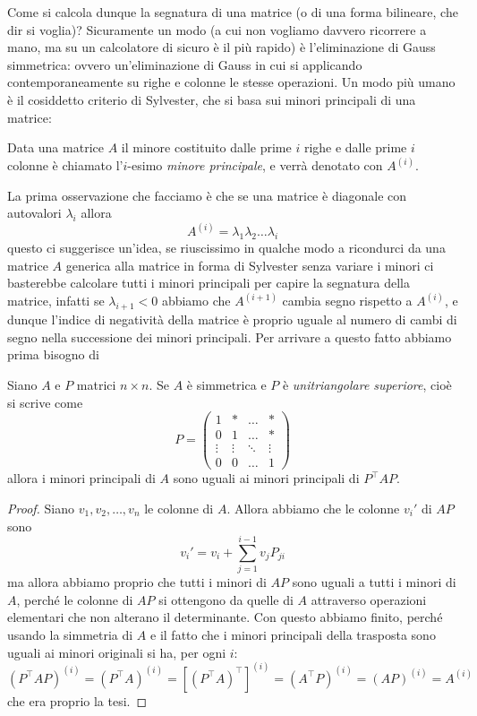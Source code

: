 \documentclass[11pt]{scrartcl}
\begin{document}
	Come si calcola dunque la segnatura di una matrice (o di una forma bilineare, che dir si voglia)? Sicuramente un modo (a cui non vogliamo davvero ricorrere a mano, ma su un calcolatore di sicuro è il più rapido) è l'eliminazione di Gauss simmetrica: ovvero un'eliminazione di Gauss in cui si applicando contemporaneamente su righe e colonne le stesse operazioni. Un modo più umano è il cosiddetto criterio di Sylvester, che si basa sui minori principali di una matrice:
	\begin{definition}
		Data una matrice $A$ il minore costituito dalle prime $i$ righe e dalle prime $i$ colonne è chiamato l'$i$-esimo \textit{minore principale}, e verrà denotato con $A^{(i)}$.
	\end{definition}
	La prima osservazione che facciamo è che se una matrice è diagonale con autovalori $\lambda_i$ allora
	$$A^{(i)}=\lambda_1\lambda_2\dots\lambda_i$$
	questo ci suggerisce un'idea, se riuscissimo in qualche modo a ricondurci da una matrice $A$ generica alla matrice in forma di Sylvester senza variare i minori ci basterebbe calcolare tutti i minori principali per capire la segnatura della matrice, infatti se $\lambda_{i+1}<0$ abbiamo che $A^{(i+1)}$ cambia segno rispetto a $A^{(i)}$, e dunque l'indice di negatività della matrice è proprio uguale al numero di cambi di segno nella successione dei minori principali. Per arrivare a questo fatto abbiamo prima bisogno di
	\begin{lemma}
		Siano $A$ e $P$ matrici $n\times n$. Se $A$ è simmetrica e $P$ è \textit{unitriangolare superiore}, cioè si scrive come
		$$P=
		\begin{pmatrix}
			1 & * & \dots & * \\
			0 & 1 & \dots & * \\
			\vdots & \vdots & \ddots & \vdots \\
			0 & 0 & \dots & 1
		\end{pmatrix}
		$$
		allora i minori principali di $A$ sono uguali ai minori principali di $P^\intercal A P$.
	\end{lemma}
	\begin{proof}
		Siano $v_1,v_2,\dots,v_n$ le colonne di $A$. Allora abbiamo che le colonne $v_i'$ di $AP$ sono 
		$$v_i'=v_i+\sum_{j=1}^{i-1}v_jP_{ji}$$
		ma allora abbiamo proprio che tutti i minori di $AP$ sono uguali a tutti i minori di $A$, perché le colonne di $AP$ si ottengono da quelle di $A$ attraverso operazioni elementari che non alterano il determinante. Con questo abbiamo finito, perché usando la simmetria di $A$ e il fatto che i minori principali della trasposta sono uguali ai minori originali si ha, per ogni $i$:
		$$\left(P^\intercal A P\right)^{(i)}=\left(P^\intercal A\right)^{(i)}=\left[\left(P^\intercal A\right)^\intercal\right]^{(i)}=\left(A^\intercal P\right)^{(i)}=\left(AP\right)^{(i)}=A^{(i)}$$
		che era proprio la tesi.
	\end{proof}
\end{document}
